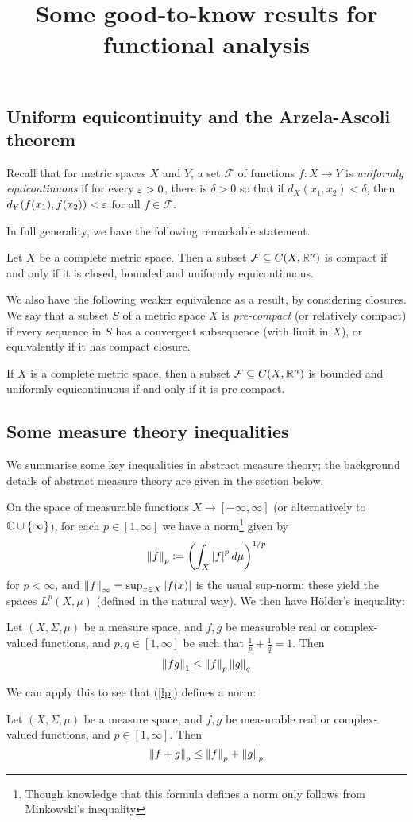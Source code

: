 \documentclass[11pt]{article}
\title{Some good-to-know results for functional analysis}
\renewcommand{\F}{\mathcal{F}}
\begin{document}
\maketitle
\subsection*{Uniform equicontinuity and the Arzela-Ascoli theorem}
Recall that for metric spaces $X$ and $Y$, a set $\F$ of functions $f : X \to Y$ is \emph{uniformly equicontinuous} if for every $\varepsilon > 0$, there is $\delta > 0$ so that if $d_X(x_1, x_2) < \delta$, then $d_Y(f(x_1), f(x_2)) < \varepsilon$ for all $f \in \F$.

In full generality, we have the following remarkable statement.
\begin{theorem}
    Let $X$ be a complete metric space. Then a subset $\F \subseteq C(X, \R^n)$ is compact if and only if it is closed, bounded and uniformly equicontinuous.
\end{theorem}
We also have the following weaker equivalence as a result, by considering closures. We say that a subset $S$ of a metric space $X$ is \emph{pre-compact} (or relatively compact) if every sequence in $S$ has a convergent subsequence (with limit in $X$), or equivalently if it has compact closure.
\begin{corollary}
    If $X$ is a complete metric space, then a subset $\F \subseteq C(X, \R^n)$  is bounded and uniformly equicontinuous if and only if it is pre-compact.
\end{corollary}
\subsection*{Some measure theory inequalities}
We summarise some key inequalities in abstract measure theory; the background details of abstract measure theory are given in the section below.

On the space of measurable functions $X \to [-\infty, \infty]$ (or alternatively to $\mathbb{C} \cup \left\{  \infty  \right\}$), for each $p \in [1, \infty]$ we have a norm\footnote{Though knowledge that this formula defines a norm only follows from Minkowski's inequality} given by
\begin{align}\label{lp}
    \left\| f \right\|_p \vcentcolon= \left(  \int_X\left| f \right|^pd\mu  \right)^{1/p}
\end{align}
for $p < \infty$, and $\left\| f \right\|_\infty = \sup_{x \in X}\left| f(x) \right|$ is the usual sup-norm; these yield the spaces $L^p(X, \mu)$ (defined in the natural way). We then have H\"older's inequality:
\begin{theorem}
    Let $(X, \Sigma, \mu)$ be a measure space, and $f, g$ be measurable real or complex-valued functions, and $p, q \in [1, \infty]$ be such that $\frac1p + \frac1q = 1$. Then
    $$
        \left\| fg \right\|_1 \leq \left\| f \right\|_p\left\| g \right\|_q
    $$
\end{theorem}
We can apply this to see that (\ref{lp}) defines a norm:
\begin{theorem}
    Let $(X, \Sigma, \mu)$ be a measure space, and $f, g$ be measurable real or complex-valued functions, and $p \in [1, \infty]$. Then
    $$
        \left\| f + g \right\|_p \leq \left\| f \right\|_p + \left\| g \right\|_p
    $$
\end{theorem}
\end{document}
